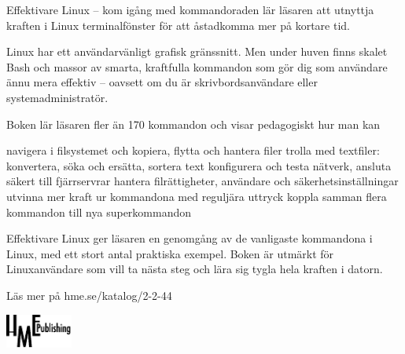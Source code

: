 \documentclass[a4paper,final]{memoir} %
\begin{document}
{\small

\begin{multicols}{2}


\medskip

Effektivare Linux -- kom igång med kommandoraden lär läsaren att utnyttja kraften i Linux terminalfönster för att åstadkomma mer på kortare tid.

\medskip

Linux har ett användarvänligt grafisk gränssnitt. Men under huven finns skalet Bash och massor av smarta, kraftfulla kommandon som gör dig som användare ännu mera effektiv -- oavsett om du är skrivbordsanvändare eller systemadministratör.

\medskip

Boken lär läsaren fler än 170 kommandon och visar pedagogiskt hur man kan 

\begin{itemize}
\pitem navigera i filsystemet och kopiera, flytta och hantera filer
\pitem trolla med textfiler: konvertera, söka och ersätta, sortera text
\pitem konfigurera och testa nätverk, ansluta säkert till fjärrservrar
\pitem hantera filrättigheter, användare och säkerhetsinställningar
\pitem utvinna mer kraft ur kommandona med reguljära uttryck
\pitem koppla samman flera kommandon till nya superkommandon
\end{itemize}

Effektivare Linux ger läsaren en genomgång av de vanligaste kommandona i Linux, med ett stort antal praktiska exempel. Boken är utmärkt för Linuxanvändare som vill ta nästa steg och lära sig tygla hela kraften i datorn. 
\end{multicols}

}

\vspace*{0pt plus 2fill}

{\Large

Läs mer på hme.se/katalog/2-2-44

}

\vspace*{0pt plus 6fill}

\hfill\noindent\includegraphics[width=22mm]{bilder804-all/logo_final_bw}

\newpage

~
\end{document}
